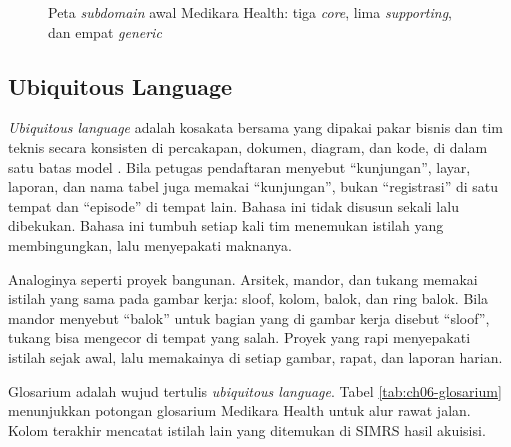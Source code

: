 \begin{figure}[!htb]
  \centering
  
  \caption{Peta \textit{subdomain} awal Medikara Health: tiga \textit{core}, lima
           \textit{supporting}, dan empat \textit{generic}}
  \label{fig:ch06-peta-subdomain}
\end{figure}

\subsection{Ubiquitous Language}

\textit{Ubiquitous language} adalah kosakata bersama yang dipakai pakar bisnis dan tim teknis secara
konsisten di percakapan, dokumen, diagram, dan kode, di dalam satu batas model
\cite{evans2003,c06-fowler-ul}. Bila petugas pendaftaran menyebut ``kunjungan'', layar, laporan,
dan nama tabel juga memakai ``kunjungan'', bukan ``registrasi'' di satu tempat dan ``episode'' di
tempat lain. Bahasa ini tidak disusun sekali lalu dibekukan. Bahasa ini tumbuh setiap kali tim
menemukan istilah yang membingungkan, lalu menyepakati maknanya.

Analoginya seperti proyek bangunan. Arsitek, mandor, dan tukang memakai istilah yang sama pada
gambar kerja: sloof, kolom, balok, dan ring balok. Bila mandor menyebut ``balok'' untuk bagian yang
di gambar kerja disebut ``sloof'', tukang bisa mengecor di tempat yang salah. Proyek yang rapi
menyepakati istilah sejak awal, lalu memakainya di setiap gambar, rapat, dan laporan harian.

Glosarium adalah wujud tertulis \textit{ubiquitous language}. Tabel \ref{tab:ch06-glosarium}
menunjukkan potongan glosarium Medikara Health untuk alur rawat jalan. Kolom terakhir mencatat
istilah lain yang ditemukan di SIMRS hasil akuisisi.

